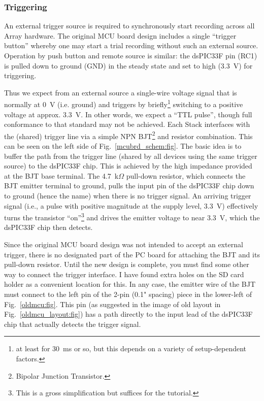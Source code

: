 \documentclass[letterpaper]{article}
\begin{document}
\subsubsection{Triggering}
\label{triggering:sec}

An external trigger source is required to synchronously start
recording across all Array hardware. The original MCU board design
includes a single ``trigger button'' whereby one may start a trial
recording without such an external source. Operation by push
button and remote source is similar: the dsPIC33F pin (RC1) is pulled
down to ground (GND) in the steady state and set to high (3.3~V) for
triggering.

Thus we expect from an external source a single-wire voltage signal
that is normally at 0~V (i.e. ground) and triggers by
briefly\footnote{at least for 30~ms or so, but this depends on a
  variety of setup-dependent factors.} switching to a positive voltage
at approx. 3.3~V. In other words, we expect a ``TTL pulse'', though
full conformance to that standard may not be achieved. Each Stack
interfaces with the (shared) trigger line via a simple NPN
BJT\footnote{Bipolar Junction Transistor.} and resistor
combination. This can be seen on the left side of
Fig.~\ref{mcubrd_schem:fig}. The basic idea is to buffer the path from
the trigger line (shared by all devices using the same trigger source)
to the dsPIC33F chip. This is achieved by the high impedance provided
at the BJT base terminal. The 4.7~k$\Omega$ pull-down resistor, which
connects the BJT emitter terminal to ground, pulls the input pin of
the dsPIC33F chip down to ground (hence the name) when there is no
trigger signal. An arriving trigger signal (i.e., a pulse with
positive magnitude at the supply level, 3.3~V) effectively turns the
transistor ``on''\footnote{This is a gross simplification but suffices
  for the tutorial.} and drives the emitter voltage to near 3.3~V,
which the dsPIC33F chip then detects.

Since the original MCU board design was not intended to accept an
external trigger, there is no designated part of the PC board for
attaching the BJT and its pull-down resistor. Until the new design is
complete, you must find some other way to connect the trigger
interface. I have found extra holes on the SD card holder as a
convenient location for this. In any case, the emitter wire of the BJT
must connect to the left pin of the 2-pin (0.1" spacing) piece in the
lower-left of Fig.~\ref{oldmcu:fig}. This pin (as suggested in the
image of old layout in Fig.~\ref{oldmcu_layout:fig}) has a path
directly to the input lead of the dsPIC33F chip that actually detects
the trigger signal.
\end{document}
